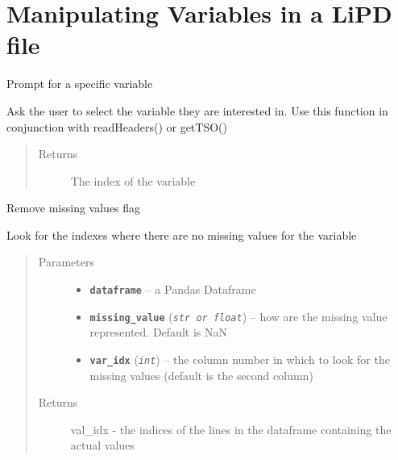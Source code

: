 \documentclass[letterpaper,10pt,english]{sphinxmanual}
\begin{document}
\section{Manipulating Variables in a LiPD file}
\label{LIPDutils:manipulating-variables-in-a-lipd-file}

\begin{fulllineitems}
\label{LIPDutils:pyleoclim.promptForVariable}
Prompt for a specific variable

Ask the user to select the variable they are interested in.
Use this function in conjunction with readHeaders() or getTSO()
\begin{quote}\begin{description}
\item[{Returns}] \leavevmode
The index of the variable

\end{description}\end{quote}

\end{fulllineitems}


\begin{fulllineitems}
\label{LIPDutils:pyleoclim.valuesLoc}
Remove missing values flag

Look for the indexes where there are no missing values for the variable
\begin{quote}\begin{description}
\item[{Parameters}] \leavevmode\begin{itemize}
\item {} 
\textbf{\texttt{dataframe}} -- a Pandas Dataframe

\item {} 
\textbf{\texttt{missing\_value}} (\emph{\texttt{str or float}}) -- how are the missing value represented.
Default is NaN

\item {} 
\textbf{\texttt{var\_idx}} (\emph{\texttt{int}}) -- the column number in which to look for the missing
values (default is the second column)

\end{itemize}

\item[{Returns}] \leavevmode
val\_idx - the indices of the lines in the dataframe containing the actual values

\end{description}\end{quote}

\end{fulllineitems}
\end{document}
